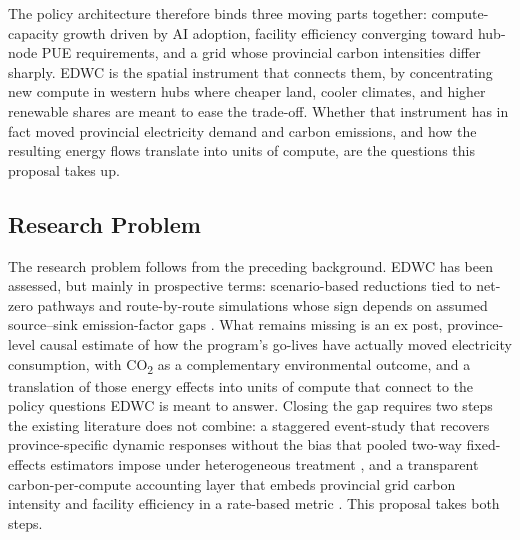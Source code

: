 \documentclass[12pt,a4paper]{article}
\begin{document}
The policy architecture therefore binds three moving parts together:
compute-capacity growth driven by AI adoption, facility efficiency
converging toward hub-node PUE requirements, and a grid whose
provincial carbon intensities differ sharply. EDWC is the spatial
instrument that connects them, by concentrating new compute in western
hubs where cheaper land, cooler climates, and higher renewable shares
are meant to ease the trade-off. Whether that instrument has in fact
moved provincial electricity demand and carbon emissions, and how the
resulting energy flows translate into units of compute, are the
questions this proposal takes up.


\subsection{Research Problem}
%
%

The research problem follows from the preceding background. EDWC has
been assessed, but mainly in prospective terms: scenario-based
reductions tied to net-zero pathways and route-by-route simulations
whose sign depends on assumed source--sink emission-factor gaps
\citep{zhangetal-2025-easterndatawestern,zhangetal-2025-decarbonizingdatacenters}.
What remains missing is an ex post, province-level causal estimate of
how the program's go-lives have actually moved electricity consumption,
with CO\textsubscript{2} as a complementary environmental outcome, and
a translation of those energy effects into units of compute that
connect to the policy questions EDWC is meant to answer. Closing the
gap requires two steps the existing literature does not combine: a
staggered event-study that recovers province-specific dynamic responses
without the bias that pooled two-way fixed-effects estimators impose
under heterogeneous treatment
\citep{sunabraham-2021-estimatingdynamictreatmenta}, and a transparent
carbon-per-compute accounting layer that embeds provincial grid carbon
intensity and facility efficiency in a rate-based metric
\citep{guptaetal-2022-chasingcarbonelusive}. This proposal takes both
steps.
\end{document}
